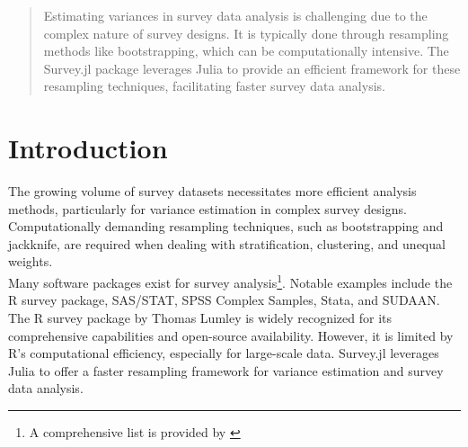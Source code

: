 \documentclass{juliacon}
\begin{document}


\maketitle

\begin{abstract}

Estimating variances in survey data analysis is challenging due to the complex nature of survey designs. It is typically done through resampling methods like bootstrapping, which can be computationally intensive. The Survey.jl package leverages Julia to provide an efficient framework for these resampling techniques, facilitating faster survey data analysis.

\end{abstract}

\section{Introduction}

The growing volume of survey datasets necessitates more efficient analysis methods, particularly for variance estimation in complex survey designs. Computationally demanding resampling techniques, such as bootstrapping and jackknife, are required when dealing with stratification, clustering, and unequal weights. 
\\

Many software packages exist for survey analysis\footnote{A comprehensive list is provided by \cite{SummarySurveyAnalysis}}. Notable examples include the R survey package, SAS/STAT, SPSS Complex Samples, Stata, and SUDAAN. The R survey package by Thomas Lumley\cite{lumley2004analysis} is widely recognized for its comprehensive capabilities and open-source availability. However, it is limited by R's computational efficiency, especially for large-scale data. Survey.jl leverages Julia to offer a faster resampling framework for variance estimation and survey data analysis.




\end{document}

